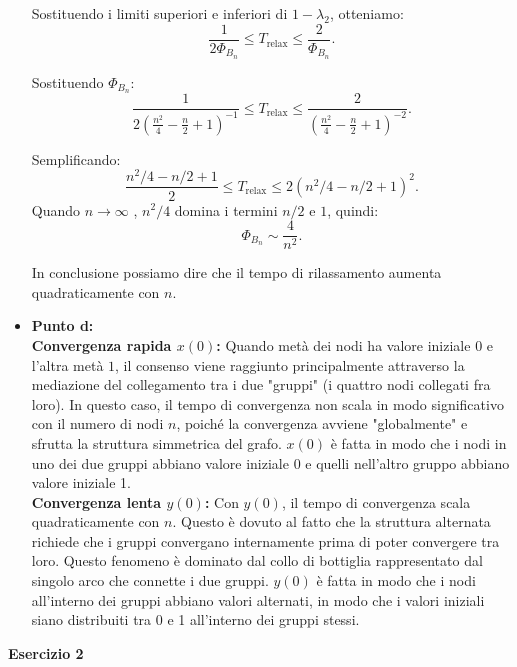\documentclass[a4paper,12pt]{article}
\begin{document}
\begin{itemize}
		Sostituendo i limiti superiori e inferiori di \(1 - \lambda_2\), otteniamo:
		\[
		\frac{1}{2 \Phi_{B_n}} \leq T_{\text{relax}} \leq \frac{2}{\Phi_{B_n}}.
		\]
		
		Sostituendo \(\Phi_{B_n}\):
		\[
		\frac{1}{2 \left(\frac{n^2}{4} - \frac{n}{2} + 1\right)^{-1}} \leq T_{\text{relax}} \leq \frac{2}{\left(\frac{n^2}{4} - \frac{n}{2} + 1\right)^{-2}}.
		\]
		
		Semplificando:
		\[
		\frac{n^2 / 4 - n / 2 + 1}{2} \leq T_{\text{relax}} \leq 2 \left(n^2 / 4 - n / 2 + 1\right)^2.
		\]
		Quando $n \rightarrow \infty$ , \(n^2 / 4\) domina i termini \(n / 2\) e \(1\), quindi:
		\[
		\Phi_{B_n} \sim \frac{4}{n^2}.
		\]
		
		In conclusione possiamo dire che il tempo di rilassamento aumenta quadraticamente con $n$. 
		
		\item \textbf{Punto d: }\\
		\textbf{Convergenza rapida $x(0)$:} Quando metà dei nodi ha valore iniziale \(0\) e l'altra metà \(1\), il consenso viene raggiunto principalmente attraverso la mediazione del collegamento tra i due "gruppi" (i quattro nodi collegati fra loro). In questo caso, il tempo di convergenza non scala in modo significativo con il numero di nodi \(n\), poiché la convergenza avviene "globalmente" e sfrutta la struttura simmetrica del grafo. $x(0)$ è fatta in modo che i nodi in uno dei due gruppi abbiano valore iniziale 0 e quelli nell'altro gruppo abbiano valore iniziale 1.\\
		\textbf{Convergenza lenta $y(0)$:} Con \(y(0)\), il tempo di convergenza scala quadraticamente con \(n\). Questo è dovuto al fatto che la struttura alternata richiede che i gruppi convergano internamente prima di poter convergere tra loro. Questo fenomeno è dominato dal collo di bottiglia rappresentato dal singolo arco che connette i due gruppi. $y(0)$ è fatta in modo che i nodi all'interno dei gruppi abbiano valori alternati, in modo che i valori iniziali siano distribuiti tra 0 e 1 all'interno dei gruppi stessi.
	\end{itemize} 
	\centering \textbf{Esercizio 2}\\
\end{document}
